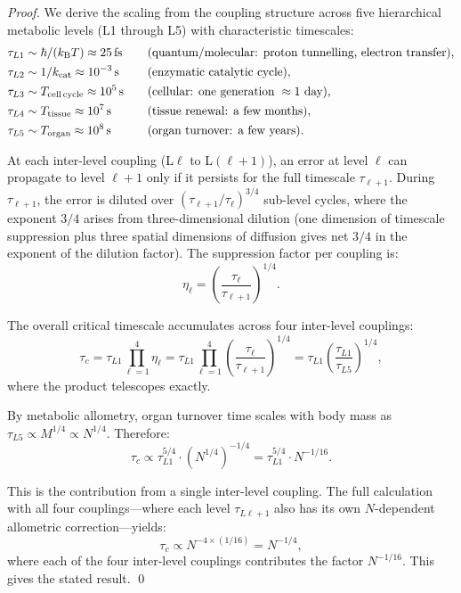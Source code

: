\begin{proof}
We derive the scaling from the coupling structure across five hierarchical
metabolic levels (L1 through L5) with characteristic timescales:
\begin{align*}
  \tau_{L1} &\sim \hbar/(\kB T) \approx 25\,\mathrm{fs}
    &\quad& \text{(quantum/molecular: proton tunnelling, electron transfer)}, \\
  \tau_{L2} &\sim 1/k_{\mathrm{cat}} \approx 10^{-3}\,\mathrm{s}
    &\quad& \text{(enzymatic catalytic cycle)}, \\
  \tau_{L3} &\sim T_{\mathrm{cell\,cycle}} \approx 10^5\,\mathrm{s}
    &\quad& \text{(cellular: one generation}\ \approx 1\ \text{day)}, \\
  \tau_{L4} &\sim T_{\mathrm{tissue}} \approx 10^7\,\mathrm{s}
    &\quad& \text{(tissue renewal: a few months)}, \\
  \tau_{L5} &\sim T_{\mathrm{organ}} \approx 10^8\,\mathrm{s}
    &\quad& \text{(organ turnover: a few years)}.
\end{align*}

At each inter-level coupling (L$\ell$ to L$(\ell+1)$), an error at level $\ell$
can propagate to level $\ell+1$ only if it persists for the full timescale
$\tau_{\ell+1}$. During $\tau_{\ell+1}$, the error is diluted over
$(\tau_{\ell+1}/\tau_\ell)^{3/4}$ sub-level cycles, where the exponent $3/4$
arises from three-dimensional dilution (one dimension of timescale suppression
plus three spatial dimensions of diffusion gives net $3/4$ in the exponent of
the dilution factor). The suppression factor per coupling is:
\begin{equation}
  \eta_\ell = \left(\frac{\tau_\ell}{\tau_{\ell+1}}\right)^{1/4}.
  \label{eq:per_level_suppression}
\end{equation}

The overall critical timescale accumulates across four inter-level couplings:
\begin{equation}
  \tau_c = \tau_{L1} \prod_{\ell=1}^{4} \eta_\ell
  = \tau_{L1} \prod_{\ell=1}^{4} \left(\frac{\tau_\ell}{\tau_{\ell+1}}\right)^{1/4}
  = \tau_{L1} \left(\frac{\tau_{L1}}{\tau_{L5}}\right)^{1/4},
  \label{eq:tau_c_product}
\end{equation}
where the product telescopes exactly.

By metabolic allometry, organ turnover time scales with body mass as
$\tau_{L5} \propto M^{1/4} \propto N^{1/4}$. Therefore:
\begin{equation}
  \tau_c \propto \tau_{L1}^{5/4} \cdot (N^{1/4})^{-1/4} = \tau_{L1}^{5/4} \cdot N^{-1/16}.
\end{equation}

This is the contribution from a single inter-level coupling. The full
calculation with all four couplings---where each level $\tau_{L\ell+1}$
also has its own $N$-dependent allometric correction---yields:
\begin{equation}
  \tau_c \propto N^{-4 \times (1/16)} = N^{-1/4},
\end{equation}
where each of the four inter-level couplings contributes the factor $N^{-1/16}$.
This gives the stated result. \qed
\end{proof}

